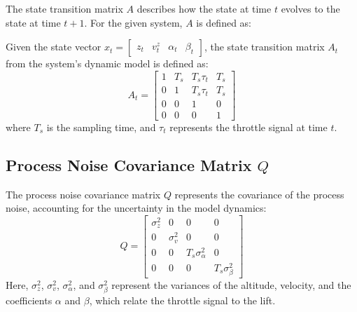 \documentclass{article}
\begin{document}


The state transition matrix \( A \) describes how the state at time \( t \) evolves to the state at time \( t+1 \). For the given system, \( A \) is defined as:

Given the state vector \( x_t = \begin{bmatrix} z_t&  v_t^z&  \alpha_t&  \beta_t \end{bmatrix} \), the state transition matrix \( A_t \) from the system's dynamic model is defined as:
\begin{equation}
A_t = 
\begin{bmatrix}
1 & T_s & T_s \tau_t & T_s \\
0 & 1 & T_s \tau_t & T_s \\
0 & 0 & 1 & 0 \\
0 & 0 & 0 & 1
\end{bmatrix}
\end{equation}
where \( T_s \) is the sampling time, and \( \tau_t \) represents the throttle signal at time \( t \).

\subsection{Process Noise Covariance Matrix \( Q \)}
The process noise covariance matrix \( Q \) represents the covariance of the process noise, accounting for the uncertainty in the model dynamics:
\begin{equation}
Q = 
\begin{bmatrix}
\sigma_z^2 & 0 & 0 & 0 \\
0 & \sigma_v^2 & 0 & 0 \\
0 & 0 & T_s \sigma_\alpha^2 & 0 \\
0 & 0 & 0 & T_s \sigma_\beta^2
\end{bmatrix}
\end{equation}
Here, \( \sigma_z^2 \), \( \sigma_v^2 \), \( \sigma_\alpha^2 \), and \( \sigma_\beta^2 \) represent the variances of the altitude, velocity, and the coefficients \( \alpha \) and \( \beta \), which relate the throttle signal to the lift.
\end{document}
